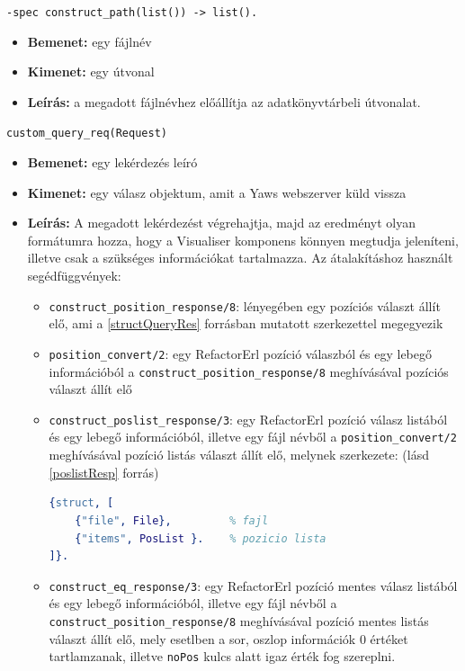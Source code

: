 \noindent \lstinline{-spec construct_path(list()) -> list().}
\begin{itemize}
    \item \textbf{Bemenet:} egy fájlnév
    \item \textbf{Kimenet:} egy útvonal
    \item \textbf{Leírás:} a megadott fájlnévhez előállítja az adatkönyvtárbeli útvonalat.
\end{itemize} 


\noindent \lstinline{custom_query_req(Request)}
\begin{itemize}
    \item \textbf{Bemenet:} egy lekérdezés leíró
    \item \textbf{Kimenet:} egy válasz objektum, amit a Yaws webszerver küld vissza
    \item \textbf{Leírás:} A megadott lekérdezést végrehajtja, majd az eredményt olyan formátumra hozza, hogy a Visualiser komponens könnyen megtudja jeleníteni, illetve csak a szükséges információkat tartalmazza. Az átalakításhoz használt segédfüggvények:
    \begin{itemize}
        \item \lstinline{construct_position_response/8}: lényegében egy pozíciós választ állít elő, ami a \ref{structQueryRes} forrásban mutatott szerkezettel megegyezik
        
        \item \lstinline{position_convert/2}: egy RefactorErl pozíció válaszból és egy lebegő információból a \lstinline{construct_position_response/8} meghívásával pozíciós választ állít elő
        
        \item \lstinline{construct_poslist_response/3}: egy RefactorErl pozíció válasz listából és egy lebegő információból, illetve egy fájl névből a \lstinline{position_convert/2} meghívásával pozíció listás választ állít elő, melynek szerkezete: (lásd \ref{poslistResp} forrás)
        
\lstset{caption=Pozíció listás válasz, label=poslistResp}
\begin{lstlisting}[language={erlang}]
 {struct, [
    {"file", File},         % fajl
    {"items", PosList }.    % pozicio lista
]}.
\end{lstlisting}

    \item \lstinline{construct_eq_response/3}: egy RefactorErl pozíció mentes válasz listából és egy lebegő információból, illetve egy fájl névből a \lstinline{construct_position_response/8} meghívásával pozíció mentes listás választ állít elő, mely esetlben a sor, oszlop információk 0 értéket tartlamzanak, illetve \lstinline{noPos} kulcs alatt igaz érték fog szereplni.
        
        
\end{itemize} 
    \end{itemize}
    
